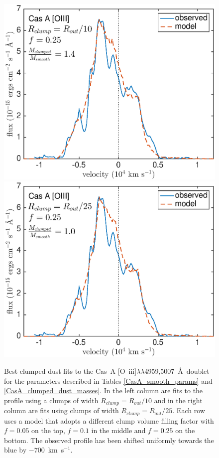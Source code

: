 \begin{figure}
\vspace{6mm}
\includegraphics[scale=0.43,clip=true, trim=30 0 50 20]{chapters/chapter6/figs/CasA/clumped/CasA_OIII_c10_f0_25}
\includegraphics[scale=0.43,clip=true, trim=30 0 40 20]{chapters/chapter6/figs/CasA/clumped/CasA_OIII_c25_f0_25}

\caption{Best clumped dust fits to the Cas~A [O~{\sc iii}]$\lambda\lambda$4959,5007~\AA\ doublet for the parameters described in Tables \ref{CasA_smooth_params} and \ref{CasA_clumped_dust_masses}.  In the left column are fits to the profile using a clumps of width $R_{clump}=R_{out}/10$ and in the right column are fits using clumps of width $R_{clump}=R_{out}/25$.  Each row uses a model that adopts a different clump volume filling factor with $f=0.05$ on the top, $f=0.1$ in the middle and $f=0.25$ on the bottom.  The observed profile has been shifted uniformly towards the blue by $-700$~km~s$^{-1}$.}
\label{CasA_OIII_clumped}
\end{figure}

